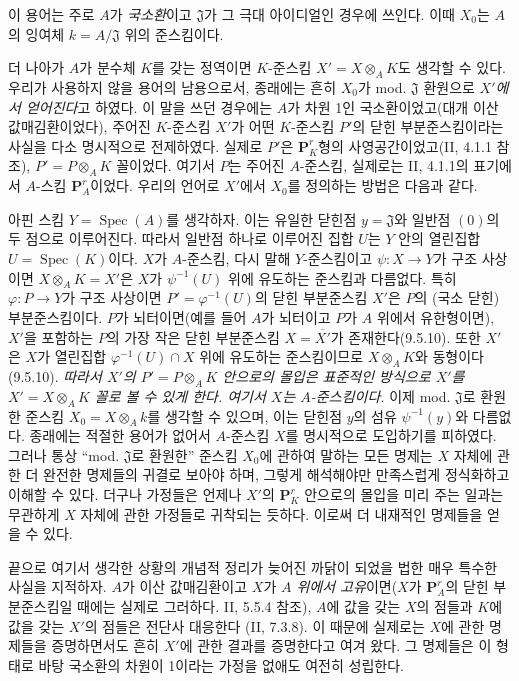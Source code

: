 \begin{env}[3.7.2]
\label{I.3.7.2-ko}
이 용어는 주로 $A$가 \emph{국소환}이고 $\mathfrak{J}$가 그 극대
아이디얼인 경우에 쓰인다. 이때 $X_0$는 $A$의 잉여체
$k=A/\mathfrak{J}$ 위의 준스킴이다.

더 나아가 $A$가 분수체 $K$를 갖는 정역이면 $K$-준스킴
$X'=X\otimes_A K$도 생각할 수 있다. 우리가 사용하지 않을 용어의
남용으로서, 종래에는 흔히 $X_0$가 mod. $\mathfrak{J}$ 환원으로
\emph{$X'$에서 얻어진다}고 하였다. 이 말을 쓰던 경우에는 $A$가
차원 1인 국소환이었고(대개 이산 값매김환이었다), 주어진
$K$-준스킴 $X'$가 어떤 $K$-준스킴 $P'$의 닫힌 부분준스킴이라는
사실을 다소 명시적으로 전제하였다. 실제로 $P'$은
$\mathbf{P}_K^r$형의 사영공간이었고(II, 4.1.1 참조),
$P'=P\otimes_A K$ 꼴이었다. 여기서 $P$는 주어진 $A$-준스킴,
실제로는 II, 4.1.1의 표기에서 $A$-스킴 $\mathbf{P}_A^r$이었다.
우리의 언어로 $X'$에서 $X_0$를 정의하는 방법은 다음과 같다.

아핀 스킴 $Y=\operatorname{Spec}(A)$를 생각하자. 이는 유일한
닫힌점 $y=\mathfrak{J}$와 일반점 $(0)$의 두 점으로 이루어진다. 따라서 일반점
하나로 이루어진 집합 $U$는 $Y$ 안의 열린집합
$U=\operatorname{Spec}(K)$이다.
$X$가 $A$-준스킴, 다시 말해 $Y$-준스킴이고 $\psi:X\to Y$가 구조
사상이면 $X\otimes_A K=X'$은 $X$가 $\psi^{-1}(U)$ 위에 유도하는
준스킴과 다름없다. 특히 $\varphi:P\to Y$가 구조 사상이면
$P'=\varphi^{-1}(U)$의 닫힌 부분준스킴 $X'$은 $P$의 (국소 닫힌)
부분준스킴이다. $P$가 뇌터이면(예를 들어 $A$가 뇌터이고 $P$가
$A$ 위에서 유한형이면), $X'$을 포함하는 $P$의 가장 작은 닫힌
부분준스킴 $X=\overline{X'}$가 존재한다(9.5.10). 또한 $X'$은
$X$가 열린집합 $\varphi^{-1}(U)\cap X$ 위에 유도하는 준스킴이므로
$X\otimes_A K$와 동형이다(9.5.10).
\emph{따라서 $X'$의 $P'=P\otimes_A K$ 안으로의 몰입은 표준적인
방식으로 $X'$를 $X'=X\otimes_A K$ 꼴로 볼 수 있게 한다. 여기서
$X$는 $A$-준스킴이다.} 이제 mod. $\mathfrak{J}$로 환원한 준스킴
$X_0=X\otimes_A k$를 생각할 수 있으며, 이는 닫힌점 $y$의 섬유
$\psi^{-1}(y)$와 다름없다. 종래에는 적절한 용어가 없어서
$A$-준스킴 $X$를 명시적으로 도입하기를 피하였다. 그러나 통상
``mod. $\mathfrak{J}$로 환원한'' 준스킴 $X_0$에 관하여 말하는 모든
명제는 $X$ 자체에 관한 더 완전한 명제들의 귀결로 보아야 하며,
그렇게 해석해야만 만족스럽게 정식화하고 이해할 수 있다. 더구나
가정들은 언제나 $X'$의 $\mathbf{P}_K^r$ 안으로의 몰입을 미리 주는
일과는 무관하게 $X$ 자체에 관한 가정들로 귀착되는 듯하다. 이로써
더 내재적인 명제들을 얻을 수 있다.
\end{env}

\begin{env}[3.7.3]
\label{I.3.7.3-ko}
끝으로 여기서 생각한 상황의 개념적 정리가 늦어진 까닭이 되었을 법한
매우 특수한 사실을 지적하자. $A$가 이산 값매김환이고 $X$가
\emph{$A$ 위에서 고유}이면($X$가 $\mathbf{P}_A^r$의 닫힌
부분준스킴일 때에는 실제로 그러하다. II, 5.5.4 참조), $A$에 값을 갖는
$X$의 점들과 $K$에 값을 갖는 $X'$의 점들은 전단사 대응한다
(II, 7.3.8). 이 때문에 실제로는 $X$에 관한 명제들을 증명하면서도
흔히 $X'$에 관한 결과를 증명한다고 여겨 왔다. 그 명제들은 이 형태로
바탕 국소환의 차원이 1이라는 가정을 없애도 여전히 성립한다.
\end{env}
